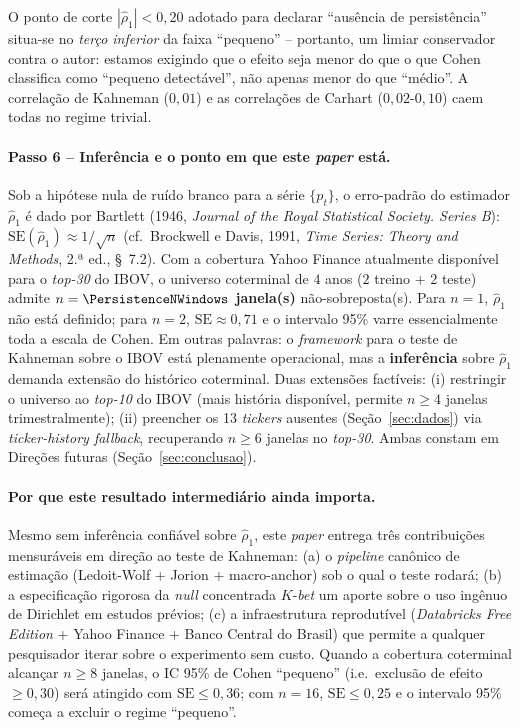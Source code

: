 \documentclass[12pt,a4paper,oneside]{article}
\begin{document}
O ponto de corte \textbf{$|\hat{\rho}_1| < 0{,}20$} adotado para
declarar ``ausência de persistência'' situa-se no \textit{terço
inferior} da faixa ``pequeno'' -- portanto, um limiar conservador
contra o autor: estamos exigindo que o efeito seja menor do que o que
Cohen classifica como ``pequeno detectável'', não apenas menor do que
``médio''. A correlação de Kahneman ($0{,}01$) e as correlações de
Carhart ($0{,}02$-$0{,}10$) caem todas no regime trivial.

\paragraph{Passo 6 -- Inferência e o ponto em que este \textit{paper}
está.}
Sob a hipótese nula de ruído branco para a série $\{p_t\}$, o
erro-padrão do estimador $\hat{\rho}_1$ é dado por Bartlett (1946,
\textit{Journal of the Royal Statistical Society. Series B}):
$\mathrm{SE}(\hat{\rho}_1) \approx 1/\sqrt{n}$ (cf.\ Brockwell e
Davis, 1991, \textit{Time Series: Theory and Methods}, 2.ª ed.,
\S~7.2). Com a cobertura Yahoo Finance atualmente disponível para o
\textit{top-30} do IBOV, o universo coterminal de $4$ anos ($2$
treino + $2$ teste) admite \textbf{$n = \PersistenceNWindows$
janela(s)} não-sobreposta(s). Para $n = 1$, $\hat{\rho}_1$ não está
definido; para $n = 2$, $\mathrm{SE} \approx 0{,}71$ e o intervalo
95\% varre essencialmente toda a escala de Cohen. Em outras palavras:
o \textit{framework} para o teste de Kahneman sobre o IBOV está
plenamente operacional, mas a \textbf{inferência} sobre $\hat{\rho}_1$
demanda extensão do histórico coterminal. Duas extensões factíveis:
(i) restringir o universo ao \textit{top-10} do IBOV (mais história
disponível, permite $n \geq 4$ janelas trimestralmente); (ii)
preencher os 13 \textit{tickers} ausentes (Seção~\ref{sec:dados}) via
\textit{ticker-history fallback}, recuperando $n \geq 6$ janelas no
\textit{top-30}. Ambas constam em Direções futuras
(Seção~\ref{sec:conclusao}).

\paragraph{Por que este resultado intermediário ainda importa.}
Mesmo sem inferência confiável sobre $\hat{\rho}_1$, este
\textit{paper} entrega três contribuições mensuráveis em direção ao
teste de Kahneman: (a) o \textit{pipeline} canônico de estimação
(Ledoit-Wolf + Jorion + macro-anchor) sob o qual o teste rodará;
(b) a especificação rigorosa da \textit{null} concentrada $K$-\textit{bet}
\textemdash{} um aporte sobre o uso ingênuo de Dirichlet em estudos
prévios; (c) a infraestrutura reprodutível (\textit{Databricks Free
Edition} + Yahoo Finance + Banco Central do Brasil) que permite a
qualquer pesquisador iterar sobre o experimento sem custo. Quando a
cobertura coterminal alcançar $n \geq 8$ janelas, o IC 95\% de Cohen
``pequeno'' (i.e.\ exclusão de efeito $\geq 0{,}30$) será atingido com
$\mathrm{SE} \leq 0{,}36$; com $n = 16$, $\mathrm{SE} \leq 0{,}25$ e
o intervalo 95\% começa a excluir o regime ``pequeno''.
\end{document}
